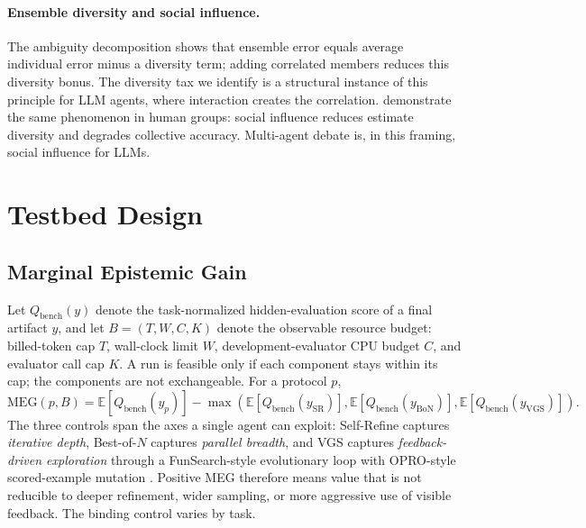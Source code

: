 \documentclass{article}
\newcommand{\meg}{\mathrm{MEG}}
\newcommand{\qbench}{Q_{\text{bench}}}
\begin{document}
\paragraph{Ensemble diversity and social influence.}
The ambiguity decomposition \citep{krogh1994neural} shows that ensemble error equals average individual error minus a diversity term; adding correlated members reduces this diversity bonus. The diversity tax we identify is a structural instance of this principle for LLM agents, where interaction creates the correlation. \citet{lorenz2011social} demonstrate the same phenomenon in human groups: social influence reduces estimate diversity and degrades collective accuracy. Multi-agent debate is, in this framing, social influence for LLMs.

\section{Testbed Design}
\label{sec:testbed}

\subsection{Marginal Epistemic Gain}
\label{sec:meg}

Let $\qbench(y)$ denote the task-normalized hidden-evaluation score of a final artifact $y$, and let $B=(T,W,C,K)$ denote the observable resource budget: billed-token cap $T$, wall-clock limit $W$, development-evaluator CPU budget $C$, and evaluator call cap $K$. A run is feasible only if each component stays within its cap; the components are not exchangeable. For a protocol $p$,
\begin{equation}
\meg(p,B)=\mathbb{E}\!\left[\qbench(y_p)\right]-
\max\!\left(
\mathbb{E}\!\left[\qbench(y_{\mathrm{SR}})\right],
\mathbb{E}\!\left[\qbench(y_{\mathrm{BoN}})\right],
\mathbb{E}\!\left[\qbench(y_{\mathrm{VGS}})\right]
\right).
\label{eq:meg}
\end{equation}
The three controls span the axes a single agent can exploit: Self-Refine captures \emph{iterative depth}, Best-of-$N$ captures \emph{parallel breadth}, and VGS captures \emph{feedback-driven exploration} through a FunSearch-style evolutionary loop \citep{romeraparedes2024funsearch} with OPRO-style scored-example mutation \citep{yang2024opro}. Positive MEG therefore means value that is not reducible to deeper refinement, wider sampling, or more aggressive use of visible feedback. The binding control varies by task.
\end{document}
